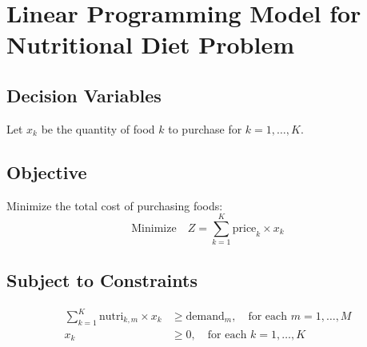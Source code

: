 \documentclass{article}
\begin{document}
\section*{Linear Programming Model for Nutritional Diet Problem}

\subsection*{Decision Variables}
Let \( x_k \) be the quantity of food \( k \) to purchase for \( k = 1, \ldots, K \).

\subsection*{Objective}
Minimize the total cost of purchasing foods:
\[
\text{Minimize} \quad Z = \sum_{k=1}^{K} \text{price}_k \times x_k
\]

\subsection*{Subject to Constraints}
\begin{align*}
\sum_{k=1}^{K} \text{nutri}_{k,m} \times x_k & \geq \text{demand}_m, \quad \text{for each } m = 1, \ldots, M \\
x_k & \geq 0, \quad \text{for each } k = 1, \ldots, K
\end{align*}
\end{document}
